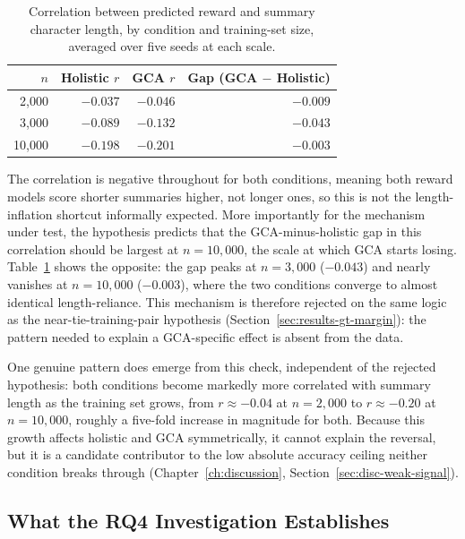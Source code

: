 \begin{table}[htbp]
\centering
\caption[Reward-model score correlation with summary length, by training-set size]{Correlation between predicted reward and summary character length,
by condition and training-set size, averaged over five seeds at each scale.}
\label{tab:length-shortcut}
\begin{tabular}{rrrr}
\toprule
$n$ & Holistic $r$ & GCA $r$ & Gap (GCA $-$ Holistic) \\
\midrule
2{,}000  & $-0.037$ & $-0.046$ & $-0.009$ \\
3{,}000  & $-0.089$ & $-0.132$ & $-0.043$ \\
10{,}000 & $-0.198$ & $-0.201$ & $-0.003$ \\
\bottomrule
\end{tabular}
\end{table}

The correlation is negative throughout for both conditions, meaning both
reward models score shorter summaries higher, not longer ones, so this is
not the length-inflation shortcut informally expected. More importantly for
the mechanism under test, the hypothesis predicts that the GCA-minus-holistic
gap in this correlation should be largest at $n=10{,}000$, the scale at
which GCA starts losing. Table~\ref{tab:length-shortcut} shows the opposite:
the gap peaks at $n=3{,}000$ ($-0.043$) and nearly vanishes at $n=10{,}000$
($-0.003$), where the two conditions converge to almost identical
length-reliance. This mechanism is therefore rejected on the same logic as
the near-tie-training-pair hypothesis
(Section~\ref{sec:results-gt-margin}): the pattern needed to explain a
GCA-specific effect is absent from the data.

One genuine pattern does emerge from this check, independent of the
rejected hypothesis: both conditions become markedly more correlated with
summary length as the training set grows, from $r\approx-0.04$ at
$n=2{,}000$ to $r\approx-0.20$ at $n=10{,}000$, roughly a five-fold increase
in magnitude for both. Because this growth affects holistic and GCA
symmetrically, it cannot explain the reversal, but it is a candidate
contributor to the low absolute accuracy ceiling neither condition breaks
through (Chapter~\ref{ch:discussion}, Section~\ref{sec:disc-weak-signal}).

\subsection{What the RQ4 Investigation Establishes}
\label{sec:results-gt-summary}

